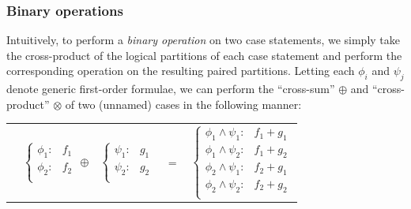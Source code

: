 \documentclass[twoside,11pt]{article}
\begin{document}
\subsubsection*{Binary operations}
Intuitively, to perform a \emph{binary
 operation} on two case statements, we simply take the cross-product
of the logical partitions of each case statement and perform the
corresponding operation on the resulting paired partitions.  Letting
each $\phi_i$ and $\psi_j$ denote generic first-order formulae, we can
perform the ``cross-sum'' $\oplus$ and ``cross-product'' $\otimes$ of two (unnamed) cases in the
following manner:

{\footnotesize 
\begin{center}
\begin{tabular}{r c c c l}
&
\hspace{-6mm} 
  $\begin{cases}
    \phi_1: & f_1 \\ 
    \phi_2: & f_2 \\ 
  \end{cases}$
$\oplus$
&
\hspace{-4mm}
  $\begin{cases}
    \psi_1: & g_1 \\ 
    \psi_2: & g_2 \\ 
  \end{cases}$
&
\hspace{-2mm} 
$ = $
&
\hspace{-2mm}
  $\begin{cases}
  \phi_1 \wedge \psi_1: & f_1 + g_1 \\ 
  \phi_1 \wedge \psi_2: & f_1 + g_2 \\ 
  \phi_2 \wedge \psi_1: & f_2 + g_1 \\ 
  \phi_2 \wedge \psi_2: & f_2 + g_2 \\ 
  \end{cases}$
\end{tabular}
\vspace{4mm}
\hspace{-2mm}
\end{center}}
\end{document}
